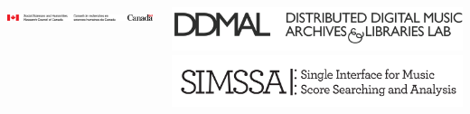 \documentclass[final]{beamer}
\newlength{\onecolwid}
\begin{document}
\begin{frame}[fragile,t]
\begin{columns}
\begin{column}{\onecolwid}
\begin{block}{}
\centering
\includegraphics[width=\onecolwid]{images/SSHRC_logo}
\end{block}
\end{column}
\begin{column}{\onecolwid}
\begin{block}{}
\centering
\includegraphics[scale=0.36]{images/ddmal_logo_large}
\includegraphics[scale=1]{images/SIMSSA_logo}
\end{block}
\end{column}
\end{columns}
\end{frame}
\end{document}
